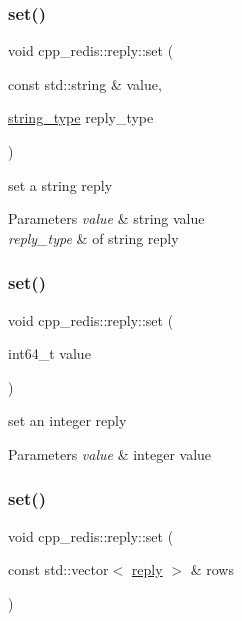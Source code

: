 \subsubsection{\texorpdfstring{set()}{set()}\hspace{0.1cm}{\footnotesize\ttfamily [2/4]}}
{\footnotesize\ttfamily void cpp\+\_\+redis\+::reply\+::set (\begin{DoxyParamCaption}\item[{const std\+::string \&}]{value,  }\item[{\hyperlink{classcpp__redis_1_1reply_ac192ba4cb8f2bb6e7cb465edf755328b}{string\+\_\+type}}]{reply\+\_\+type }\end{DoxyParamCaption})}

set a string reply


\begin{DoxyParams}{Parameters}
{\em value} & string value \\
\hline
{\em reply\+\_\+type} & of string reply \\
\hline
\end{DoxyParams}
\mbox{\label{classcpp__redis_1_1reply_a2443bd6d4fb35279db198ba876e1ad34}} 
\subsubsection{\texorpdfstring{set()}{set()}\hspace{0.1cm}{\footnotesize\ttfamily [3/4]}}
{\footnotesize\ttfamily void cpp\+\_\+redis\+::reply\+::set (\begin{DoxyParamCaption}\item[{int64\+\_\+t}]{value }\end{DoxyParamCaption})}

set an integer reply


\begin{DoxyParams}{Parameters}
{\em value} & integer value \\
\hline
\end{DoxyParams}
\mbox{\label{classcpp__redis_1_1reply_ab64ee3720832e60ed47b91fd5b3045bd}} 
\subsubsection{\texorpdfstring{set()}{set()}\hspace{0.1cm}{\footnotesize\ttfamily [4/4]}}
{\footnotesize\ttfamily void cpp\+\_\+redis\+::reply\+::set (\begin{DoxyParamCaption}\item[{const std\+::vector$<$ \hyperlink{classcpp__redis_1_1reply}{reply} $>$ \&}]{rows }\end{DoxyParamCaption})}

